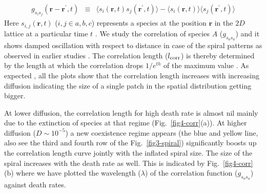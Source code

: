 \documentclass[aps, pre, twocolumn, amsmath, superscriptaddress,showkeys,showpacs]{revtex4-1}
\begin{document}
{	\begin{eqnarray}
g_{s_i s_j}(\mathbf{r}-\mathbf{r^\prime} , t) &\equiv& \langle s_i(\mathbf{r},t) s_j(\mathbf{r^\prime},t) \rangle -\langle s_i(\mathbf{r},t) \rangle  \langle  s_j(\mathbf{r^\prime},t) \rangle
\end{eqnarray}
\noindent
Here $s_{i,j}(\mathbf{r},t)$ ($i,j\in a,b,c$) represents  a species at the position $\mathbf{r}$ in the $2D$ lattice at a particular time $t$ \cite{reichenbach2007noise}. {We study the correlation of species $A$ ($g_{s_a s_a}$) and it shows damped oscillation with respect to distance in case of the spiral patterns as observed in earlier studies \cite{reichenbach2007noise,he2011coexistence}.} The correlation length ($l_{\rm corr}$) is thereby determined by the length at which the correlation drops $1/e ^{th}$ of the maximum value \cite{reichenbach2008self}. {{ As expected \cite{reichenbach2007mobility},} all the plots show that the correlation length increases with increasing diffusion indicating the size of a single patch in the spatial distribution getting bigger.} 
{At lower diffusion, the correlation length for high death rate is almost nil mainly due to the extinction of species at that regime (Fig.\ \ref{fig4-corr}(a)). At higher diffusion ($D\sim 10^{-5}$) 
 { a new coexistence regime appears } (the blue and yellow line, also see the third and fourth row of the Fig.\ \ref{fig3-spiral}) significantly boosts up the correlation length curve jointly with the inflated spiral size. %
{ The size of the spiral increases with the death rate as well. This is indicated by Fig.~\ref{fig4-corr}(b) where we have plotted the wavelength ($\lambda$) of the correlation function ($g_{s_a s_a}$) against death rates.}

}}
\end{document}
